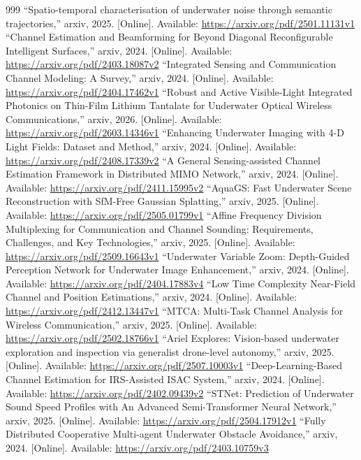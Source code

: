 \documentclass[10pt,journal]{IEEEtran}
\begin{document}
\begin{thebibliography}{999}
 ``Spatio-temporal characterisation of underwater noise through semantic trajectories,'' arxiv, 2025. [Online]. Available: \url{https://arxiv.org/pdf/2501.11131v1}
 ``Channel Estimation and Beamforming for Beyond Diagonal Reconfigurable Intelligent Surfaces,'' arxiv, 2024. [Online]. Available: \url{https://arxiv.org/pdf/2403.18087v2}
 ``Integrated Sensing and Communication Channel Modeling: A Survey,'' arxiv, 2024. [Online]. Available: \url{https://arxiv.org/pdf/2404.17462v1}
 ``Robust and Active Visible-Light Integrated Photonics on Thin-Film Lithium Tantalate for Underwater Optical Wireless Communications,'' arxiv, 2026. [Online]. Available: \url{https://arxiv.org/pdf/2603.14346v1}
 ``Enhancing Underwater Imaging with 4-D Light Fields: Dataset and Method,'' arxiv, 2024. [Online]. Available: \url{https://arxiv.org/pdf/2408.17339v2}
 ``A General Sensing-assisted Channel Estimation Framework in Distributed MIMO Network,'' arxiv, 2024. [Online]. Available: \url{https://arxiv.org/pdf/2411.15995v2}
 ``AquaGS: Fast Underwater Scene Reconstruction with SfM-Free Gaussian Splatting,'' arxiv, 2025. [Online]. Available: \url{https://arxiv.org/pdf/2505.01799v1}
 ``Affine Frequency Division Multiplexing for Communication and Channel Sounding: Requirements, Challenges, and Key Technologies,'' arxiv, 2025. [Online]. Available: \url{https://arxiv.org/pdf/2509.16643v1}
 ``Underwater Variable Zoom: Depth-Guided Perception Network for Underwater Image Enhancement,'' arxiv, 2024. [Online]. Available: \url{https://arxiv.org/pdf/2404.17883v4}
 ``Low Time Complexity Near-Field Channel and Position Estimations,'' arxiv, 2024. [Online]. Available: \url{https://arxiv.org/pdf/2412.13447v1}
 ``MTCA: Multi-Task Channel Analysis for Wireless Communication,'' arxiv, 2025. [Online]. Available: \url{https://arxiv.org/pdf/2502.18766v1}
 ``Ariel Explores: Vision-based underwater exploration and inspection via generalist drone-level autonomy,'' arxiv, 2025. [Online]. Available: \url{https://arxiv.org/pdf/2507.10003v1}
 ``Deep-Learning-Based Channel Estimation for IRS-Assisted ISAC System,'' arxiv, 2024. [Online]. Available: \url{https://arxiv.org/pdf/2402.09439v2}
 ``STNet: Prediction of Underwater Sound Speed Profiles with An Advanced Semi-Transformer Neural Network,'' arxiv, 2025. [Online]. Available: \url{https://arxiv.org/pdf/2504.17912v1}
 ``Fully Distributed Cooperative Multi-agent Underwater Obstacle Avoidance,'' arxiv, 2024. [Online]. Available: \url{https://arxiv.org/pdf/2403.10759v3}

\end{thebibliography}
\end{document}
